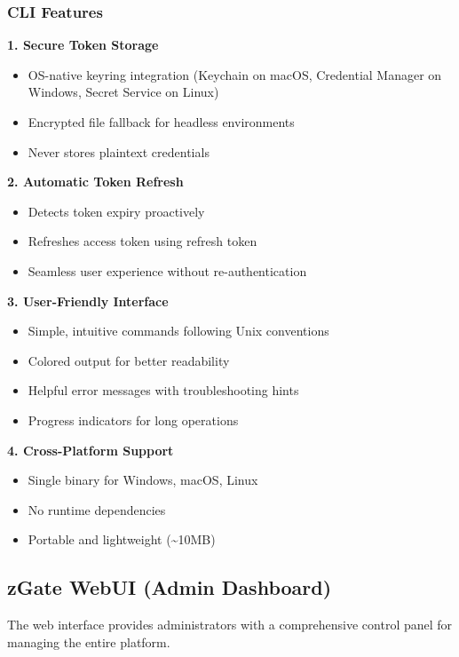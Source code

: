 \subsubsection{CLI Features}

\textbf{1. Secure Token Storage}
\begin{itemize}
    \item OS-native keyring integration (Keychain on macOS, Credential Manager on Windows, Secret Service on Linux)
    \item Encrypted file fallback for headless environments
    \item Never stores plaintext credentials
\end{itemize}

\textbf{2. Automatic Token Refresh}
\begin{itemize}
    \item Detects token expiry proactively
    \item Refreshes access token using refresh token
    \item Seamless user experience without re-authentication
\end{itemize}

\textbf{3. User-Friendly Interface}
\begin{itemize}
    \item Simple, intuitive commands following Unix conventions
    \item Colored output for better readability
    \item Helpful error messages with troubleshooting hints
    \item Progress indicators for long operations
\end{itemize}

\textbf{4. Cross-Platform Support}
\begin{itemize}
    \item Single binary for Windows, macOS, Linux
    \item No runtime dependencies
    \item Portable and lightweight (\textasciitilde10MB)
\end{itemize}

\subsection{zGate WebUI (Admin Dashboard)}

The web interface provides administrators with a comprehensive control panel for managing the entire platform.

